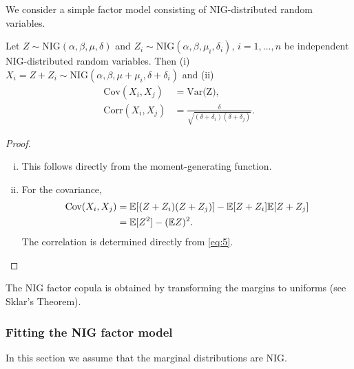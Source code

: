 We consider a simple factor model consisting of NIG-distributed random
variables.
\begin{proposition}
  \label{prop:NIG}
  Let $Z\sim \text{NIG}(\alpha, \beta, \mu, \delta)$ and
  $Z_i\sim \text{NIG}(\alpha, \beta, \mu_i, \delta_i)$,
  $i=1,\ldots, n$ be independent NIG-distributed random
  variables. Then (i) 
  $X_i = Z + Z_i\sim \text{NIG}(\alpha,\beta,\mu+\mu_i,
  \delta+\delta_i)$ and (ii)
  \begin{align}
    \text{Cov}(X_i,X_j) &= \text{Var(Z)},\nonumber\\
    \text{Corr}(X_i,X_j) &= \frac{\delta}{\sqrt{(\delta+\delta_i)
                           (\delta+\delta_j)}}. \label{eq:6}
  \end{align}
\end{proposition}
\begin{proof}
  \begin{enumerate}[(i)]
  \item This follows directly from the moment-generating function. 
  \item For the covariance,
    \begin{align*}
      \text{Cov}(X_i,X_j)
      &= {\mathbb{E}}[(Z+Z_i) (Z+Z_j)] - {\mathbb{E}}[Z+Z_i] {\mathbb{E}}[Z+Z_j]\\
      &= {\mathbb{E}}[Z^2] -({\mathbb{E}} Z)^2.
    \end{align*}
    The correlation is determined directly from \eqref{eq:5}. 
  \end{enumerate}
\end{proof}

The NIG factor copula is obtained by transforming the margins to
uniforms (see Sklar's Theorem).

\subsubsection{Fitting the NIG factor model}
\label{sec:fitt-nig-distr}

In this section we assume that the marginal distributions are NIG. 

